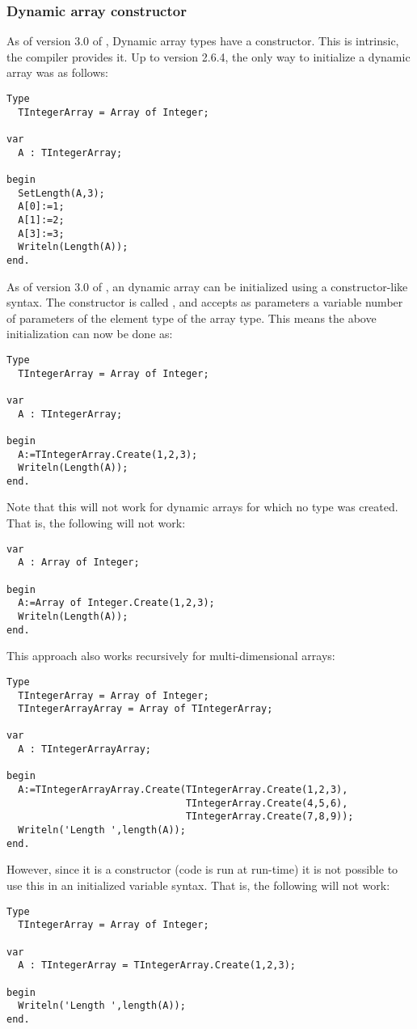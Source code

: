 \subsubsection{Dynamic array constructor}
As of version 3.0 of \fpc, Dynamic array types have a constructor. This is intrinsic, the compiler provides it.
Up to version 2.6.4, the only way to initialize a dynamic array was as follows:
\begin{verbatim}
Type
  TIntegerArray = Array of Integer;

var
  A : TIntegerArray;

begin
  SetLength(A,3);
  A[0]:=1;
  A[1]:=2;
  A[3]:=3;
  Writeln(Length(A));
end.
\end{verbatim}
As of version 3.0 of \fpc, an dynamic array can be initialized using a constructor-like syntax.
The constructor is called , and accepts as parameters a variable number of parameters of the element type of the array type.
This means the above initialization can now be done as:
\begin{verbatim}
Type
  TIntegerArray = Array of Integer;

var
  A : TIntegerArray;

begin
  A:=TIntegerArray.Create(1,2,3);
  Writeln(Length(A));
end.
\end{verbatim}
Note that this will not work for dynamic arrays for which no type was created. That is, the following will not work:
\begin{verbatim}
var
  A : Array of Integer;

begin
  A:=Array of Integer.Create(1,2,3);
  Writeln(Length(A));
end.
\end{verbatim}
This approach also works recursively for multi-dimensional arrays:
\begin{verbatim}
Type
  TIntegerArray = Array of Integer;
  TIntegerArrayArray = Array of TIntegerArray;

var
  A : TIntegerArrayArray;

begin
  A:=TIntegerArrayArray.Create(TIntegerArray.Create(1,2,3),
                               TIntegerArray.Create(4,5,6),
                               TIntegerArray.Create(7,8,9));
  Writeln('Length ',length(A));
end.
\end{verbatim}
However, since it is a constructor (code is run at run-time) it is not possible to use this in an initialized variable syntax.
That is, the following will not work:
\begin{verbatim}
Type
  TIntegerArray = Array of Integer;

var
  A : TIntegerArray = TIntegerArray.Create(1,2,3);

begin
  Writeln('Length ',length(A));
end.
\end{verbatim}

